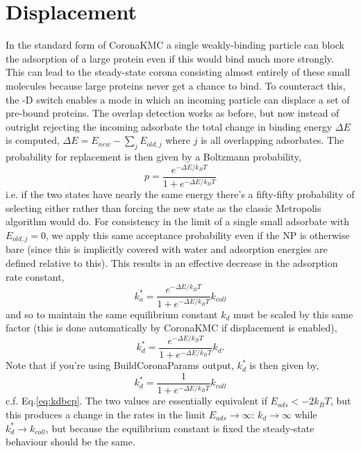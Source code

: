 \documentclass[10pt,a4paper,onecolumn]{report}
\begin{document}
\section{Displacement} \label{section:coronadisplacement}
 In the standard form of CoronaKMC a single weakly-binding particle can block the adsorption of a large protein even if this would bind much more strongly. This can lead to the steady-state corona consisting almost entirely of these small molecules because large proteins never get a chance to bind. To counteract this, the -D switch enables a mode in which an incoming particle can displace a set of pre-bound proteins. The overlap detection works as before, but now instead of outright rejecting the incoming adsorbate the total change in binding energy $\Delta E$ is computed, $\Delta E = E_{new} - \sum_j E_{old,j}$ where $j$ is all overlapping adsorbates. The probability for replacement is then given by a Boltzmann probability,
 \begin{equation}
 p = \frac{ e^{-\Delta E/k_B T} }{1 +  e^{-\Delta E/k_B T} }
 \end{equation}
i.e. if the two states have nearly the same energy there's a fifty-fifty probability of selecting either rather than forcing the new state as the classic Metropolis algorithm would do. For consistency in the limit of a single small adsorbate with $E_{old,j} = 0$, we apply this same acceptance probability even if the NP is otherwise bare (since this is implicitly covered with water and adsorption energies are defined relative to this). This results in an effective decrease in the adsorption rate constant,
\begin{equation}
k_{a}^* = \frac{ e^{-\Delta E/k_B T} }{1 +  e^{-\Delta E/k_B T} } k_{coll}
\end{equation}
and so to maintain the same equilibrium constant $k_d$ must be scaled by this same factor (this is done automatically by CoronaKMC if displacement is enabled),
\begin{equation}
k_d^* = \frac{ e^{-\Delta E/k_B T} }{1 +  e^{-\Delta E/k_B T} } k_d .
\end{equation}
Note that if you're using BuildCoronaParams output, $k_d^*$ is then given by,
 \begin{equation}
k_d^* =\frac{ 1 }{1 +  e^{-\Delta E/k_B T} }   k_{coll}
\end{equation}
c.f. Eq.\eqref{eq:kdbcp}. The two values are essentially equivalent if $E_{ads} < -2 k_B T$, but this produces a change in the rates in the limit $E_{ads} \rightarrow \infty$: $k_d \rightarrow \infty$  while $k_d^* \rightarrow k_{coll}$, but because the equilibrium constant is fixed the steady-state behaviour should be the same. 
 
\end{document}
